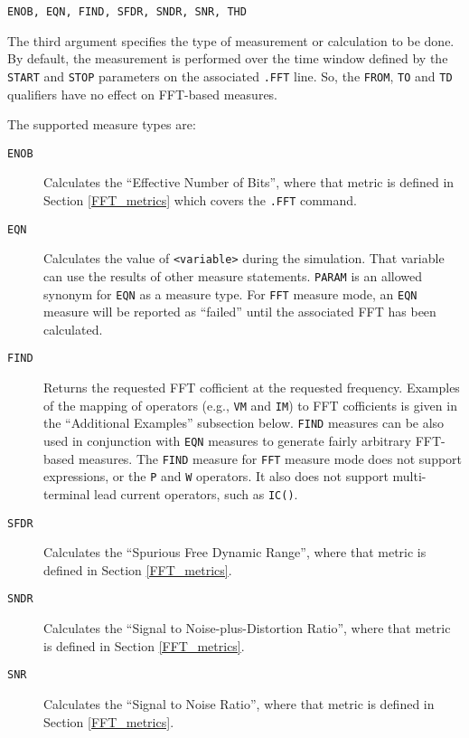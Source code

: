 \begin{Command}
\begin{Arguments}

\texttt{ENOB, EQN, FIND, SFDR, SNDR, SNR, THD}

The third argument specifies the type of measurement or calculation to
be done. By default, the measurement is performed over the time window defined
by the {\tt START} and {\tt STOP} parameters on the associated {\tt .FFT}
line.  So, the  {\tt FROM}, {\tt TO} and {\tt TD} qualifiers have no
effect on FFT-based measures.

The supported measure types are:

\begin{description}
  \item[\tt ENOB] Calculates the ``Effective Number of Bits'', where that metric
    is defined in Section \ref{FFT_metrics} which covers the \texttt{.FFT} command.

  \item[\tt EQN] Calculates the value of {\tt <variable>} during the simulation.
    That variable can use the results of other measure statements. {\tt PARAM}
    is an allowed synonym for {\tt EQN} as a measure type.  For {\tt FFT} measure
    mode, an {\tt EQN} measure will be reported as ``failed'' until the associated
    FFT has been calculated.

  \item[\tt FIND] Returns the requested FFT cofficient at the requested
    frequency.  Examples of the mapping of \Xyce{} operators (e.g., {\tt VM} and {\tt IM})
    to FFT cofficients is given in the ``Additional Examples'' subsection below.
    {\tt FIND} measures can be also used in conjunction with {\tt EQN} measures
    to generate fairly arbitrary FFT-based measures.  The {\tt FIND} measure for
    {\tt FFT} measure mode does not support expressions, or the {\tt P} and
    {\tt W} operators.  It also does not support multi-terminal lead current
    operators, such as {\tt IC()}.

  \item[\tt SFDR] Calculates the ``Spurious Free Dynamic Range'', where that metric
    is defined in Section \ref{FFT_metrics}.

  \item[\tt SNDR] Calculates the ``Signal to Noise-plus-Distortion Ratio'', where that metric
    is defined in Section \ref{FFT_metrics}.

  \item[\tt SNR] Calculates the ``Signal to Noise Ratio'', where that metric
    is defined in Section \ref{FFT_metrics}.


\end{description}
\end{Arguments}
\end{Command}
